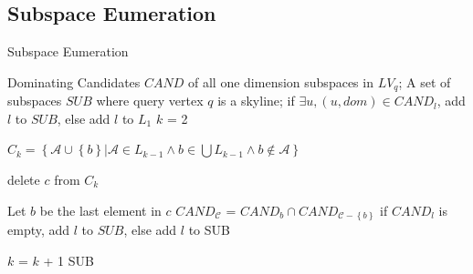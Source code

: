 \subsection{Subspace Eumeration}
\begin{algorithm}[H]
  \caption{Subspace Eumeration}\label{algo:blah}
    \begin{algorithmic}[1]
  \show\LOOP
    \REQUIRE Dominating Candidates $\mathit{CAND}$ of all one dimension subspaces in $LV_q$;
    \ENSURE A set of subspaces $SUB$ where query vertex $q$ is a skyline;
            \STATE if $\exists u, (u, dom)\in \mathit{CAND}_l$, add $l$ to $SUB$, else add $l$ to $L_1$
        \ENDFOR
        \STATE $k$ = 2
        
        
            \STATE $C_k = \left\{\mathcal{A} \cup \left\{b\right\} | \mathcal{A} \in L_{k-1} \wedge b \in \bigcup L_{k-1} \wedge b \notin \mathcal{A} \right\}$
            
                    \STATE delete $c$ from $C_k$
                    
                \ENDIF
            \ENDFOR
            
                \STATE Let $b$ be the last element in $c$
                \STATE $CAND_\mathcal{C}$ = $CAND_b \cap CAND_{\mathcal{C}-\left\{b\right\}}$
                \STATE if $CAND_l$ is empty, add $l$ to $SUB$, else add $l$ to SUB
            \ENDFOR
            
            \STATE $k$ = $k$ + 1
        \ENDWHILE
        \RETURN SUB
  \end{algorithmic}
\end{algorithm}
